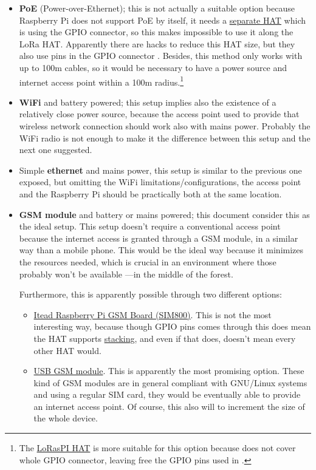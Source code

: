\documentclass[11pt,a4paper,dvipsnames,twoside]{article}
\begin{document}
\begin{itemize}
  \item \textbf{PoE} (Power-over-Ethernet); this is not actually a suitable option because Raspberry Pi does not support PoE by itself, it needs a \href{https://www.raspberrypi.org/products/poe-hat/}{separate HAT} which is using the GPIO connector, so this makes impossible to use it along the LoRa HAT. Apparently there are hacks to reduce this HAT size, but they also use pins in the GPIO connector \cite{RaspiPoEHack}. Besides, this method only works with up to 100m cables, so it would be necessary to have a power source and internet access point within a 100m radius.\footnote{The \href{https://github.com/hallard/LoRasPI}{LoRasPI HAT} is more suitable for this option because does not cover whole GPIO connector, leaving free the GPIO pins used in \cite{RaspiPoEHack}.}
  \item \textbf{WiFi} and battery powered; this setup implies also the existence of a relatively close power source, because the access point used to provide that wireless network connection should work also with mains power. Probably the WiFi radio is not enough to make it the difference between this setup and the next one suggested.
  \item Simple \textbf{ethernet} and mains power, this setup is similar to the previous one exposed, but omitting the WiFi limitations/configurations, the access point and the Raspberry Pi should be practically both at the same location.
  \item \textbf{GSM module} and battery or mains powered; this document consider this as the ideal setup. This setup doesn't require a conventional access point because the internet access is granted through a GSM module, in a similar way than a mobile phone. This would be the ideal way because it minimizes the resources needed, which is crucial in an environment where those probably won't be available ---in the middle of the forest.
  
  Furthermore, this is apparently possible through two different options:
    \begin{itemize}
      \item \href{https://www.itead.cc/wiki/RPI_SIM800_GSM/GPRS_ADD-ON_V2.0}{Itead Raspberry Pi GSM Board (SIM800)}. This is not the most interesting way, because though GPIO pins comes through this does mean the HAT supports \href{http://www.pi-in-the-sky.com/index.php?id=stacking-guide}{stacking}, and even if that does, doesn't mean every other HAT would.
      \item \href{https://tutorials-raspberrypi.com/raspberry-pi-gsm-module-mobile-internet-lte-3g-umts/}{USB GSM module}. This is apparently the most promising option. These kind of GSM modules are in general compliant with GNU/Linux systems and using a regular SIM card, they would be eventually able to provide an internet access point. Of course, this also will to increment the size of the whole device.
    \end{itemize}
\end{itemize}
\end{document}
